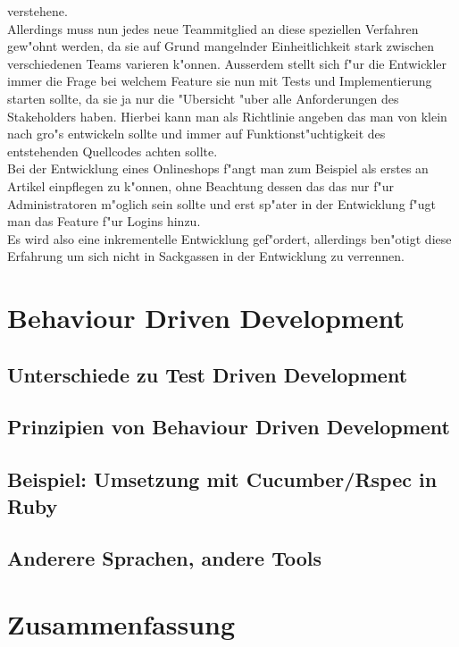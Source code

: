 \documentclass[runningheads,a4paper]{llncs}
\begin{document}
    verstehene.\\
    Allerdings muss nun jedes neue Teammitglied an diese speziellen Verfahren
    gew"ohnt werden, da sie auf Grund mangelnder Einheitlichkeit stark zwischen
    verschiedenen Teams varieren k"onnen.
    Ausserdem stellt sich f"ur die Entwickler immer die Frage bei welchem Feature
    sie nun mit Tests und Implementierung starten sollte, da sie ja nur die 
    "Ubersicht "uber alle Anforderungen des Stakeholders haben. Hierbei kann man
    als Richtlinie angeben das man von klein nach gro"s entwickeln sollte und 
    immer auf Funktionst"uchtigkeit des entstehenden Quellcodes achten sollte.\\
    Bei der Entwicklung eines Onlineshops f"angt man zum Beispiel als erstes 
    an Artikel einpflegen zu k"onnen, ohne Beachtung dessen das das nur f"ur
    Administratoren m"oglich sein sollte und erst sp"ater in der Entwicklung
    f"ugt man das Feature f"ur Logins hinzu.\\
    Es wird also eine inkrementelle Entwicklung gef"ordert, allerdings ben"otigt
    diese Erfahrung um sich nicht in Sackgassen in der Entwicklung zu verrennen.\\

\section{Behaviour Driven Development}
  \subsection{Unterschiede zu Test Driven Development}

  \subsection{Prinzipien von Behaviour Driven Development}

  \subsection{Beispiel: Umsetzung mit Cucumber/Rspec in Ruby}

  \subsection{Anderere Sprachen, andere Tools}

\section{Zusammenfassung}
\end{document}

